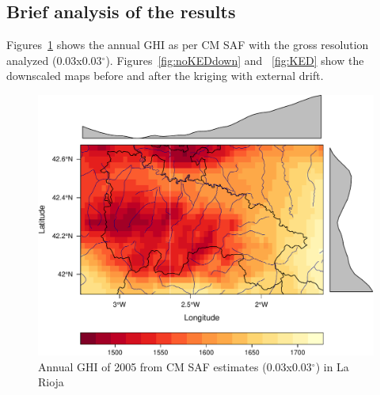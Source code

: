 \documentclass[article]{jss}
\begin{document}
\subsection{Brief analysis of the results}
\label{sec-1-7}

Figures~\ref{fig:cmsaf} shows the annual GHI as per CM SAF with the
gross resolution analyzed
(0.03x0.03$^\circ$). Figures~\ref{fig:noKEDdown} and ~\ref{fig:KED}
show the downscaled maps before and after the kriging with external
drift.


\begin{figure}
  \centering
  \includegraphics[width=\textwidth]{figs/GHI2005aCMSAF003x003.pdf}
  \caption{Annual GHI of 2005 from CM SAF estimates (0.03x0.03$^\circ$) in La Rioja}
  \label{fig:cmsaf}
\end{figure}
\end{document}
